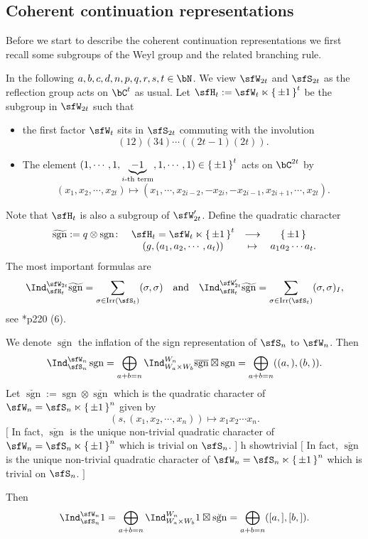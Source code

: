 \documentclass[12pt,a4paper]{amsart}
\newcommand{\trivial}[2][]{\if\relax\detokenize{#1}\relax
  {%
      \color{orange} \vspace{0em} $[$  #2 $]$
      \color{black}
  }
  \else
\ifx#1h
\ifcsname showtrivial\endcsname
{%
    \color{orange} \vspace{0em}  $[$ #2 $]$
    \color{black}
}
\fi
\else {\red Wrong argument!} \fi
\fi
}
\newcommand{\sgn}{\operatorname{sgn}}
\numberwithin{equation}{section}
\theoremstyle{remark}
\def\Irr{\mathrm{Irr}}
\def\AND{\quad \text{and} \quad}
\def\hsgn{\widetilde{\mathrm{sgn}}}
\def\bsgn{\overline{\sgn}}
\def\brsgn{\breve{\sgn}}
\begin{document}
\subsection{Coherent continuation representations}


Before we start to describe the coherent continuation representations
we first recall some subgroups of the Weyl group and the related branching rule.


In the following $a,b,c,d,n,p,q,r,s,t\in \bN$.
We view $\sfW_{2t}$ and $\sfS_{2t}$ as the reflection group acts on $\bC^{t}$ as usual. Let
$\sfH_{t} := \sfW_t\ltimes \set{\pm 1}^t$ be the subgroup in $\sfW_{2t}$ such that
\begin{itemize}
  \item the first factor $\sfW_{t}$ sits in $\sfS_{2t}$ commuting with the involution
  \[
    (12)(34)\cdots ((2t-1)(2t)).
  \]
  \item The element $(1,\cdots,1, \underbrace{-1}_{i\text{-th
        term}}, 1, \cdots, 1)\in \set{\pm 1}^{t}$ acts on $\bC^{2t}$ by
        \[
        (x_{1},x_{2},\cdots, x_{2t} ) \mapsto (x_{1},\cdots, x_{2i-2}, -x_{2i},-x_{2i-1},x_{2i+1},\cdots, x_{2t}).
        \]
\end{itemize}
Note that $\sfH_{t}$ is also a subgroup of $\sfW'_{2t}$.
Define the quadratic character
\[
  \begin{array}{rccc}
    \hsgn := q\otimes \sgn\colon & \sfH_{t}=  \sfW_{t}\ltimes \set{\pm 1}^{t}& \longrightarrow & \set{\pm 1}\\
    & (g,(a_{1},a_{2},\cdots, a_{t})) & \mapsto & a_{1}a_{2}\cdots a_{t}.
  \end{array}
\]
The most important formulas are
\begin{equation}\label{eq:CC.C}
  \Ind_{\sfH_{t}}^{\sfW_{2t}} \hsgn = \sum_{\sigma\in \Irr(\sfS_{t})} (\sigma,\sigma)
  \AND
  \Ind_{\sfH_{t}}^{\sfW'_{2t}} \hsgn = \sum_{\sigma\in \Irr(\sfS_{t})} (\sigma,\sigma)_{I},
\end{equation}
see \cite{Mc}*{p220 (6)}.

We denote $\bsgn$ the inflation of the sign
representation of $\sfS_{n}$ to $\sfW_{n}$.
Then
\[
  \Ind_{\sfS_{n}}^{\sfW_{n}}\sgn
  = \bigoplus_{a+b=n}\Ind_{W_{a}\times W_{b}}^{W_{n}} \bsgn\boxtimes \sgn
  =\bigoplus_{a+b=n} ((a,),(b,)) .
\]
Let $\brsgn := \sgn \otimes \bsgn$ which is the quadratic character of
$\sfW_{n}=\sfS_{n}\ltimes \set{\pm 1}^{n}$
given by
\[
(s,(x_{1}, x_{2}, \cdots, x_{n}))\mapsto x_{1}x_{2}\cdots x_{n}.
\]
\trivial{In fact, $\brsgn$ is the
unique non-trivial quadratic character
of $\sfW_{n}=\sfS_{n}\ltimes \set{\pm 1}^{n}$ which is trivial on $\sfS_{n}$.
}
Then
\[
  \Ind_{\sfS_{n}}^{\sfW_{n}} 1
  = \bigoplus_{a+b=n}\Ind_{W_{a}\times W_{b}}^{W_{n}} 1 \boxtimes \brsgn
  =\bigoplus_{a+b=n} ([a,],[b,]) .
\]
\end{document}
